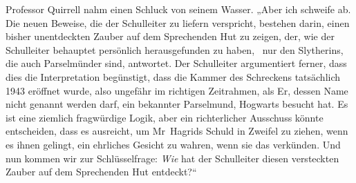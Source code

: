 Professor Quirrell nahm einen Schluck von seinem Wasser. „Aber ich schweife ab. Die neuen Beweise, die der Schulleiter zu liefern verspricht, bestehen darin, einen bisher unentdeckten Zauber auf dem Sprechenden Hut zu zeigen, der, wie der Schulleiter behauptet persönlich herausgefunden zu haben, ~nur den Slytherins, die auch Parselmünder sind, antwortet. Der Schulleiter argumentiert ferner, dass dies die Interpretation begünstigt, dass die Kammer des Schreckens tatsächlich 1943 eröffnet wurde, also ungefähr im richtigen Zeitrahmen, als Er, dessen Name nicht genannt werden darf, ein bekannter Parselmund, Hogwarts besucht hat. Es ist eine ziemlich fragwürdige Logik, aber ein richterlicher Ausschuss könnte entscheiden, dass es ausreicht, um Mr~Hagrids Schuld in Zweifel zu ziehen, wenn es ihnen gelingt, ein ehrliches Gesicht zu wahren, wenn sie das verkünden. Und nun kommen wir zur Schlüsselfrage: \emph{Wie} hat der Schulleiter diesen versteckten Zauber auf dem Sprechenden Hut entdeckt?“

